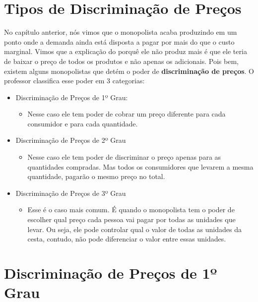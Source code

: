 \documentclass[a4paper,11pt,oneside]{book}
\theoremstyle{definition}
\theoremstyle{break}
\begin{document}
\section{Tipos de Discriminação de Preços}

No capítulo anterior, nós vimos que o monopolista acaba produzindo em um ponto onde a demanda ainda está disposta a pagar por mais do que o custo marginal. Vimos que a explicação do porquê ele não produz mais é que ele teria de baixar o preço de todos os produtos e não apenas os adicionais. Pois bem, existem alguns monopolistas que detém o poder de \textbf{discriminação de preços}. O professor classifica esse poder em 3 categorias:

\begin{itemize}
\item Discriminação de Preços de 1º Grau:
	\begin{itemize}
	\item[] Nesse caso ele tem poder de cobrar um preço diferente para cada consumidor e para cada quantidade.
	\end{itemize}
\item Discriminação de Preços de 2º Grau
	\begin{itemize}
	\item[] Nesse caso ele tem poder de discriminar o preço apenas para as quantidades compradas. Mas todos os consumidores que levarem a mesma quantidade, pagarão o mesmo preço no total.
	\end{itemize}
\item Discriminação de Preços de 3º Grau
	\begin{itemize}
	\item[] Esse é o caso mais comum. É quando o monopolista tem o poder de escolher qual preço cada pessoa vai pagar por todas as unidades que levar. Ou seja, ele pode controlar qual o valor de todas as unidades da cesta, contudo, não pode diferenciar o valor entre essas unidades.
	\end{itemize}
\end{itemize}

\section{Discriminação de Preços de 1º Grau}
\end{document}
